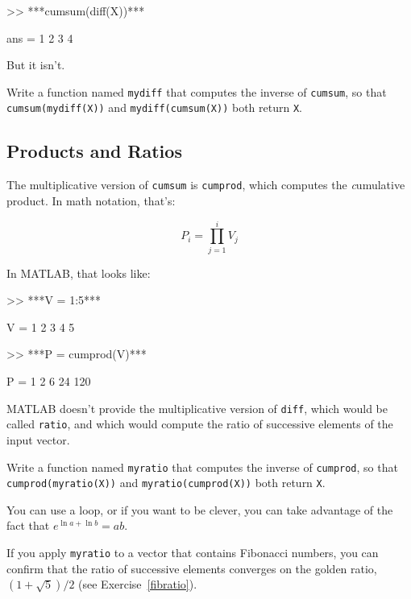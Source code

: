 \begin{code}
>> ***cumsum(diff(X))***

ans = 1     2     3     4
\end{code}

But it isn't.

\begin{ex}
Write a function named {\tt mydiff} that computes the
inverse of {\tt cumsum}, so that {\tt cumsum(mydiff(X))} and
{\tt mydiff(cumsum(X))} both return {\tt X}.

\end{ex}


\subsection{Products and Ratios}

The multiplicative version of {\tt cumsum} is {\tt cumprod},
which computes the {\emph cumulative product}.  In math notation,
that's:


\begin{equation}
P_i = \prod_{j=1}^i V_j
\end{equation}

In MATLAB, that looks like:

\begin{code}
>> ***V = 1:5***

V = 1     2     3     4     5

>> ***P = cumprod(V)***

P = 1     2     6    24   120
\end{code}

MATLAB doesn't provide the multiplicative version
of {\tt diff}, which would be called {\tt ratio}, and which would
compute the ratio of successive elements of the input vector.

\begin{ex}
Write a function named {\tt myratio} that computes the
inverse of {\tt cumprod}, so that {\tt cumprod(myratio(X))} and
{\tt myratio(cumprod(X))} both
return {\tt X}.

You can use a loop, or if you want to be clever, you can take
advantage of the fact that $e^{\ln a + \ln b} = a b$.

If you apply {\tt myratio} to a vector that contains Fibonacci
numbers, you can confirm that the ratio of successive elements
converges on the golden ratio, $(1+\sqrt{5})/2$ (see
Exercise~\ref{fibratio}).

\end{ex}

